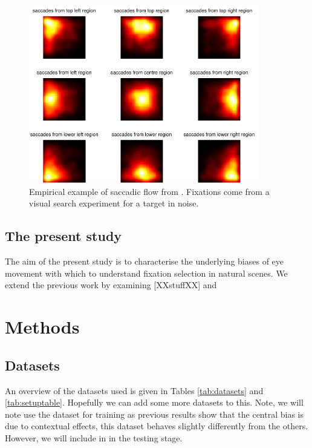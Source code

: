 \documentclass[a4paper, onecolumn, oneside, 11pt]{article}
\begin{document}
\begin{figure}
\centering
\includegraphics[width=10cm]{figs/saccDistExample.pdf}
\caption{Empirical example of saccadic flow from \cite{clarke2009}. Fixations come from a visual search experiment for a target in noise. }
\label{fig:empiricalSaccadicFlow}
\end{figure}

\subsection{The present study}
The aim of the present study is to characterise the underlying biases of eye movement with which to understand fixation selection in natural scenes. We extend the previous work by examining [XXstuffXX] and 

\section{Methods}

\subsection{Datasets}

An overview of the datasets used is given in Tables \ref{tab:datasets} and \ref{tab:setuptable}. Hopefully we can add some more datasets to this. Note, we will note use the \cite{ehinger2009} dataset for training as previous results show that the central bias is due to contextual effects, this dataset behaves slightly differently from the others. However, we will include in in the testing stage. 
\end{document}
